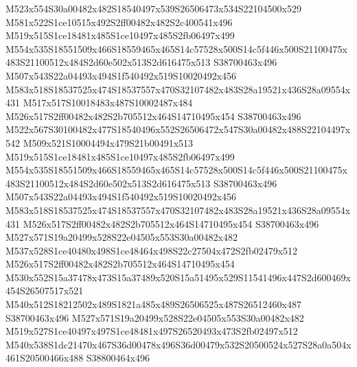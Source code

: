 \documentclass{article}
\begin{document}
\begin{multicols}{2}








M523x554S30a00482x482S18540497x539S26506473x534S22104500x529 M581x522S1ce10515x492S2ff00482x482S2c400541x496 M519x515S1ce18481x485S1ce10497x485S2fb06497x499 M554x535S18551509x466S18559465x465S14c57528x500S14c5f446x500S21100475x483S21100512x484S2d60e502x513S2d616475x513 S38700463x496 M507x543S22a04493x494S1f540492x519S10020492x456 M583x518S18537525x474S18537557x470S32107482x483S28a19521x436S28a09554x431 M517x517S10018483x487S10002487x484 M526x517S2ff00482x482S2b705512x464S14710495x454 S38700463x496 M522x567S30100482x477S18540496x552S26506472x547S30a00482x488S22104497x542 M509x521S10004494x479S21b00491x513 M519x515S1ce18481x485S1ce10497x485S2fb06497x499 M554x535S18551509x466S18559465x465S14c57528x500S14c5f446x500S21100475x483S21100512x484S2d60e502x513S2d616475x513 S38700463x496 M507x543S22a04493x494S1f540492x519S10020492x456 M583x518S18537525x474S18537557x470S32107482x483S28a19521x436S28a09554x431 M526x517S2ff00482x482S2b705512x464S14710495x454 S38700463x496 M527x571S19a20499x528S22e04505x553S30a00482x482 M537x528S1ce40480x498S1ce48464x498S22c27504x472S2fb02479x512 M526x517S2ff00482x482S2b705512x464S14710495x454 M530x552S15a37478x473S15a37489x520S15a51495x529S11541496x447S2d600469x454S26507517x521 M540x512S18212502x489S1821a485x489S26506525x487S26512460x487 S38700463x496 M527x571S19a20499x528S22e04505x553S30a00482x482 M519x527S1ce40497x497S1ce48481x497S26520493x473S2fb02497x512 M540x538S1dc21470x467S36d00478x496S36d00479x532S20500524x527S28a0a504x461S20500466x488 S38800464x496


\end{multicols}
\end{document}
